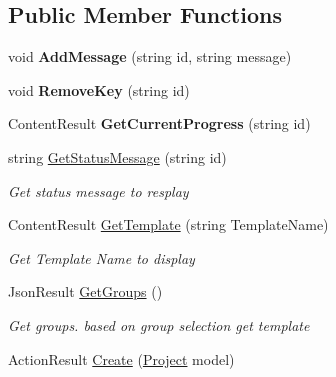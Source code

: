 \subsection*{Public Member Functions}
\begin{DoxyCompactItemize}
\item 
\mbox{\label{class_vsts_demo_builder_1_1_controllers_1_1_environment_controller_a2f78966d13ebfc59cdc8e09014229705}} 
void {\bfseries Add\+Message} (string id, string message)
\item 
\mbox{\label{class_vsts_demo_builder_1_1_controllers_1_1_environment_controller_a8bc07279221b8cf2476ab015e6a0a38e}} 
void {\bfseries Remove\+Key} (string id)
\item 
\mbox{\label{class_vsts_demo_builder_1_1_controllers_1_1_environment_controller_aba5b74b6978113f797e33255ed69ce5e}} 
Content\+Result {\bfseries Get\+Current\+Progress} (string id)
\item 
string \mbox{\hyperlink{class_vsts_demo_builder_1_1_controllers_1_1_environment_controller_ae36d3258bea98714970d2fdc5fec6bf3}{Get\+Status\+Message}} (string id)
\begin{DoxyCompactList}\small\item\em Get status message to resplay \end{DoxyCompactList}\item 
Content\+Result \mbox{\hyperlink{class_vsts_demo_builder_1_1_controllers_1_1_environment_controller_a386641d021e2872eb8a614db7d3b1a6e}{Get\+Template}} (string Template\+Name)
\begin{DoxyCompactList}\small\item\em Get Template Name to display \end{DoxyCompactList}\item 
Json\+Result \mbox{\hyperlink{class_vsts_demo_builder_1_1_controllers_1_1_environment_controller_a3b9b20acff06038e1aed58b3bfaaebd4}{Get\+Groups}} ()
\begin{DoxyCompactList}\small\item\em Get groups. based on group selection get template \end{DoxyCompactList}\item 
Action\+Result \mbox{\hyperlink{class_vsts_demo_builder_1_1_controllers_1_1_environment_controller_a05d657b039fcb027c054e24cf53e5941}{Create}} (\mbox{\hyperlink{class_vsts_demo_builder_1_1_models_1_1_project}{Project}} model)

\end{DoxyCompactItemize}
